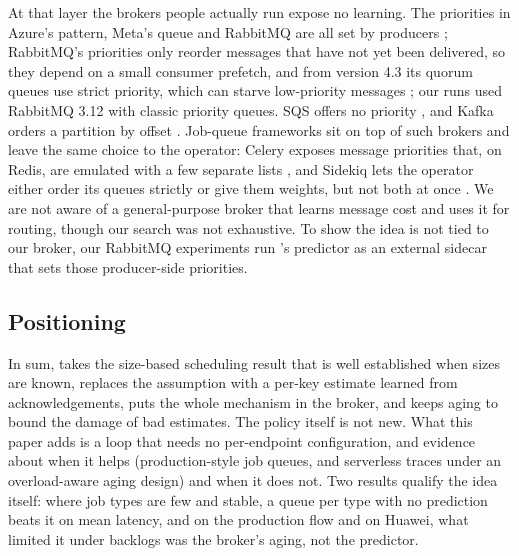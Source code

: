 At that layer the brokers people actually run expose no learning. The priorities in Azure's pattern, Meta's queue and RabbitMQ are all set by producers \citep{azurepriority,foqs2021,rabbitmqpriority}; RabbitMQ's priorities only reorder messages that have not yet been delivered, so they depend on a small consumer prefetch, and from version 4.3 its quorum queues use strict priority, which can starve low-priority messages
\citep{rabbitmqpriority}; our runs used RabbitMQ 3.12 with classic priority queues. SQS offers no priority \citep{sqstypes}, and Kafka orders a partition by offset \citep{kreps2011kafka}. Job-queue frameworks sit on top of such brokers and leave the same choice to the operator: Celery exposes message priorities that, on Redis, are emulated with a few separate lists \citep{celerypriority}, and Sidekiq lets the operator either order its queues strictly or give them weights, but not both at once \citep{sidekiqqueues}. We are not aware of a general-purpose broker that learns message cost and uses it for routing, though our search was not exhaustive. To show the idea is not tied to our broker, our RabbitMQ experiments run \sys{}'s predictor as an external sidecar that sets those producer-side priorities.

\subsection{Positioning}\label{sec:rw-position}

In sum, \sys{} takes the size-based scheduling result that is well established when sizes are known, replaces the assumption with a per-key estimate learned from acknowledgements, puts the whole mechanism in the broker, and keeps aging to bound the damage of bad estimates. The policy itself is not new. What this paper adds is a loop that needs no per-endpoint configuration, and evidence about when it helps (production-style job queues, and serverless
traces under an overload-aware aging design) and when it does not. Two results qualify the idea itself: where job types are few and stable, a queue per type with no prediction beats it on mean latency, and on the production flow and on Huawei, what limited it under backlogs was the broker's aging, not the predictor.
